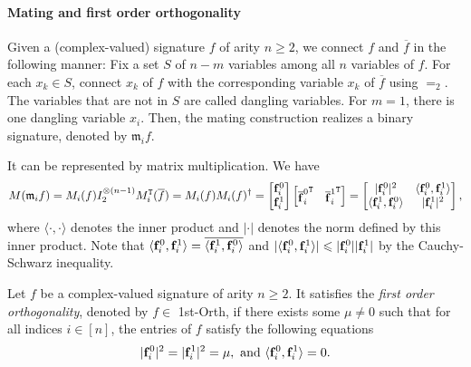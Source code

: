 \paragraph{Mating and first order orthogonality}
Given a (complex-valued) signature $f$ of arity $n\geqslant 2$, we connect $f$ and $\overline{f}$ in the following manner:
Fix a set $S$ of $n-m$ variables among all $n$ variables of $f$. 
For each $x_k\in S$, connect $x_k$ of $f$ with the corresponding variable $x_k$ of $\overline{f}$ using $=_2$. 
The variables that are not in $S$ are called dangling variables.
For $m=1$, there is one dangling variable $x_i$. Then, 
the mating construction  realizes a binary signature, denoted by $\mathfrak m_{i}f$.

It can be represented by matrix multiplication. 
We have 
\begin{equation}\label{m-form}
M(\mathfrak m_{i}f)=M_{i}(f)I_2^{\otimes (n-1)}M^{\tt T}_{i}(\overline{f})=M_i(f)M_i(f)^{\dagger}
=\begin{bmatrix}
{\bf {f}}^{0}_i\\
{\bf {f}}^{1}_i\\
\end{bmatrix}
\left[\begin{matrix}
{{\bf {\overline{f}}}^{0}_i}^{\tt T} &{{\bf {\overline{f}}}^{1}_i}^{\tt T}\\
\end{matrix}\right]
=\left[\begin{matrix}
|{\bf f}_i^0|^2 &  \langle {\bf f}_i^0, {\bf f}_i^1 \rangle\\
\langle {\bf f}_i^1, {\bf f}_i^0 \rangle & |{\bf f}_i^1|^2\\
\end{matrix}\right],
\end{equation}
where $\langle \cdot, \cdot\rangle$ denotes the 
inner product and $|\cdot|$ denotes the  norm defined by this inner product.
Note that $\langle{\bf f}^{0}_i, {\bf f}^{1}_i\rangle=\overline{\langle{\bf f}^{1}_i, {\bf f}^{0}_i\rangle}$ and $|\langle{\bf f}^{0}_i, {\bf f}^{1}_i\rangle|\leqslant|{\bf f}^{0}_i||{\bf f}^{1}_i|$ by the Cauchy-Schwarz inequality.

\begin{definition}\label{def-first-order}
       Let $f$ be a complex-valued signature of arity $n \geqslant 2$. It satisfies the \emph{first order orthogonality}, denoted by $f\in$ {\sc 1st-Orth}, if there exists some $\mu\neq 0$ such that for all indices $i\in [n]$, the entries of $f$ satisfy the following equations
\begin{equation*}
    |{\bf f}_{i}^{0}|^2=|{\bf f}_{i}^{1}|^2=\mu, \text{ and } \langle{\bf f}_{i}^{0}, {\bf f}_{i}^{1}\rangle =0.
\end{equation*}
    \end{definition}
    
